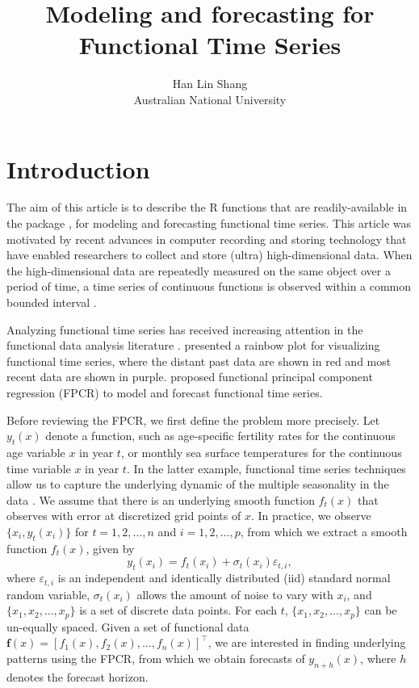 \documentclass[nojss]{jss}
\author{Han Lin Shang\\Australian National University}
\title{Modeling and forecasting for Functional Time Series}
\begin{document}
  
  
  

    
  \section*{Introduction}
  
The aim of this article is to describe the \textsf{R} functions that are readily-available in the  package \citep{HS12}, for modeling and forecasting functional time series. This article was motivated by recent advances in computer recording and storing technology that have enabled researchers to collect and store (ultra) high-dimensional data. When the high-dimensional data are repeatedly measured on the same object over a period of time, a time series of continuous functions is observed within a common bounded interval \citep{SH08}.

Analyzing functional time series has received increasing attention in the functional data analysis literature \citep[see for example,][]{AGH+09, HK10, HHK10, HK12, KMZ15}. \cite{HS10} presented a rainbow plot for visualizing functional time series, where the distant past data are shown in red and most recent data are shown in purple. \cite{AOV99} proposed functional principal component regression (FPCR) to model and forecast functional time series.

Before reviewing the FPCR, we first define the problem more precisely. Let $y_t(x)$ denote a function, such as age-specific fertility rates for the continuous age variable $x$ in year $t$, or monthly sea surface temperatures for the continuous time variable $x$ in year $t$. In the latter example, functional time series techniques allow us to capture the underlying dynamic of the multiple seasonality in the data \citep[see][for example]{SH11, Shang12a}. We assume that there is an underlying smooth function $f_t(x)$ that observes with error at discretized grid points of $x$. In practice, we observe $\{x_i, y_t(x_i)\}$ for $t=1,2,\dots,n$ and $i=1,2,\dots,p$, from which we extract a smooth function $f_t(x)$, given by
\begin{equation}
  y_t(x_i) = f_t(x_i) + \sigma_t(x_i)\varepsilon_{t,i},\label{eq:51}
\end{equation}
where $\varepsilon_{t,i}$ is an independent and identically distributed (iid) standard normal random variable, $\sigma_t(x_i)$ allows the amount of noise to vary with $x_i$, and $\{x_1,x_2,\dots,x_p\}$ is a set of discrete data points. For each $t$, $\{x_1,x_2,\dots,x_p\}$ can be un-equally spaced. Given a set of functional data $\bm{f}(x)=[f_1(x),f_2(x),\dots,f_n(x)]^{\top}$, we are interested in finding underlying patterns using the FPCR, from which we obtain forecasts of $y_{n+h}(x)$, where $h$ denotes the forecast horizon.
\end{document}
